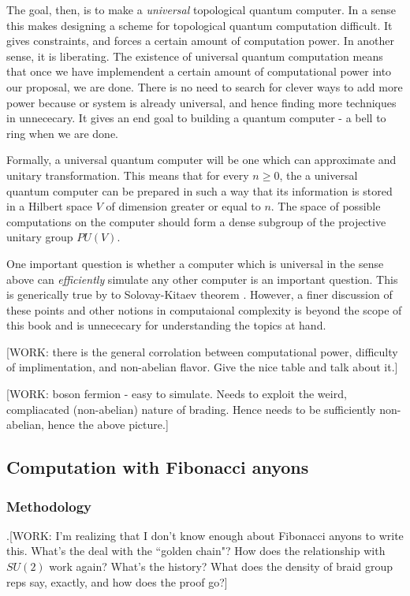 \documentclass{article}
\theoremstyle{definition}
\newcommand{\0}{\left|0\right>}
\newcommand{\1}{\left|1\right>}
\numberwithin{figure}{section}
\begin{document}
The goal, then, is to make a \textit{universal} topological quantum computer. In a sense this makes designing a scheme for topological quantum computation difficult. It gives constraints, and forces a certain amount of computation power. In another sense, it is liberating. The existence of universal quantum computation means that once we have implemendent a certain amount of computational power into our proposal, we are done. There is no need to search for clever ways to add more power because or system is already universal, and hence finding more techniques in unnececary. It gives an end goal to building a quantum computer - a bell to ring when we are done.

Formally, a universal quantum computer will be one which can approximate and unitary transformation. This means that for every $n\geq 0$, the a universal quantum computer can be prepared in such a way that its information is stored in a Hilbert space $V$ of dimension greater or equal to $n$. The space of possible computations on the computer should form a dense subgroup of the projective unitary group $PU(V)$.

One important question is whether a computer which is universal in the sense above can \textit{efficiently} simulate any other computer is an important question. This is generically true by to Solovay-Kitaev theorem \cite{kitaev1997quantum, nielsen2010quantum}. However, a finer discussion of these points and other notions in computaional complexity is beyond the scope of this book and is unnececary for understanding the topics at hand.

[WORK: there is the general corrolation between computational power, difficulty of implimentation, and non-abelian flavor. Give the nice table and talk about it.]

[WORK: boson fermion - easy to simulate. Needs to exploit the weird, compliacated (non-abelian) nature of brading. Hence needs to be sufficiently non-abelian, hence the above picture.]

\subsection{Computation with Fibonacci anyons}

\subsubsection{Methodology}

.[WORK: I'm realizing that I don't know enough about Fibonacci anyons to write this. What's the deal with the ``golden chain"? How does the relationship with $SU(2)$ work again? What's the history? What does the density of braid group reps say, exactly, and how does the proof go?]
\end{document}
